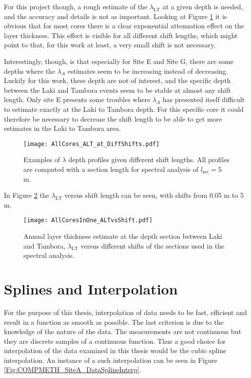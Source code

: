 \documentclass[../../CompleteThesis2/Complete_2ndDraft]{subfiles}
\begin{document}
For this project though, a rough estimate of the $\lambda_{\text{LT}}$ at a given depth is needed, and the accuracy and details is not as important. Looking at Figure \ref{Fig:AllCores_ALT_at_DiffShifts} it is obvious that for most cores there is a clear exponential attenuation effect on the layer thickness. This effect is visible for all different shift lengths, which might point to that, for this work at least, a very small shift is not necessary.

Interestingly, though, is that especially for Site E and Site G, there are some depths where the $\lambda_A$ estimates seem to be increasing instead of decreasing. Luckily for this work, these depth are not of interest, and the specific depth between the Laki and Tambora events seem to be stable at almost any shift length. Only site E presents some troubles where $\lambda_A$ has presented itself difficult to estimate exactly at the Laki to Tambora depth. For this specific core it could therefore be necessary to decrease the shift length to be able to get more estimates in the Laki to Tambora area.
\begin{figure}[h]
	\centering
	\texttt{[image: AllCores\_ALT\_at\_DiffShifts.pdf]}
	\caption[$\lambda$ depth profiles, different $s_{\text{sec}}$]{\small Examples of $\lambda$ depth profiles given different shift lengths. All profiles are computed with a section length for spectral analysis of $l_{\text{sec}}=5$ m.}
	\label{Fig:AllCores_ALT_at_DiffShifts}
\end{figure}

In Figure \ref{Fig:AllCores_ALTvsShift} the $\lambda_{\text{LT}}$ versus shift length can be seen, with shifts from 0.05 m to 5 m.

\begin{figure}[h]
	\centering
	\texttt{[image: AllCoresInOne\_ALTvsShift.pdf]}
	\caption[$\lambda_{\text{LT}}0$ vs. $s_{\text{sec}}$]{\small Annual layer thickness estimate at the depth section between Laki and Tambora, $\lambda_{\text{LT}}$ versus different shifts of the sections used in the spectral analysis.}
	\label{Fig:AllCores_ALTvsShift}
\end{figure}



\section[Splines and Interpolation]{Splines and Interpolation}	
\label{Sec:CompMeths_SplinesAndInterpolation}
For the purpose of this thesis, interpolation of data needs to be fast, efficient and result in a function as smooth as possible. The last criterion is due to the knowledge of the nature of the data. The measurements are not continuous but they are discrete samples of a continuous function. Thus a good choice for interpolation of the data examined in this thesis would be the cubic spline interpolation. An instance of a such interpolation can be seen in Figure \ref{Fig:COMPMETH_SiteA_DataSplineInterp}.
\end{document}
